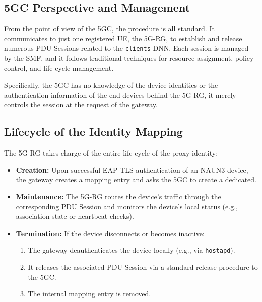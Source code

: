 \subsection{\acs{5GC} Perspective and Management}

From the point of view of the \ac{5GC}, the procedure is all standard. It communicates to just one registered \ac{UE}, the \ac{5G-RG}, to establish and release numerous \ac{PDU} Sessions related to the \texttt{clients} \ac{DNN}. Each session is managed by the \ac{SMF}, and it follows traditional techniques for resource assignment, policy control, and life cycle management.

Specifically, the \ac{5GC} has no knowledge of the device identities or the authentication information of the end devices behind the \ac{5G-RG}, it merely controls the session at the request of the gateway.

\subsection{Lifecycle of the Identity Mapping}

The \ac{5G-RG} takes charge of the entire life-cycle of the proxy identity:

\begin{itemize}
    \item \textbf{Creation:} Upon successful \ac{EAP-TLS} authentication of an \ac{NAUN3} device, the gateway creates a mapping entry and asks the \ac{5GC} to create a dedicated.
    
    \item \textbf{Maintenance:} The \ac{5G-RG} routes the device’s traffic through the corresponding \ac{PDU} Session and monitors the device’s local status (e.g., association state or heartbeat checks).

    \item {
        \textbf{Termination:} If the device disconnects or becomes inactive:
        \begin{enumerate}
            \item The gateway deauthenticates the device locally (e.g., via \texttt{hostapd}).
            \item It releases the associated \ac{PDU} Session via a standard release procedure to the \ac{5GC}.
            \item The internal mapping entry is removed.
        \end{enumerate}
    }
\end{itemize}

